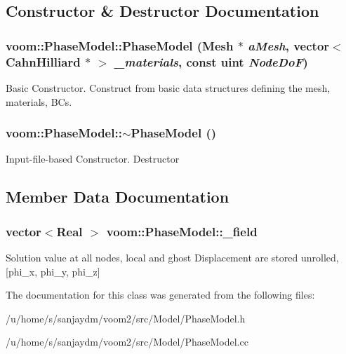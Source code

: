 \subsection{Constructor \& Destructor Documentation}
\hypertarget{classvoom_1_1_phase_model_a8cd3d41eb76b5e4f14b7f79fb546ba10}{
\subsubsection[{PhaseModel}]{\setlength{\rightskip}{0pt plus 5cm}voom::PhaseModel::PhaseModel ({\bf Mesh} $\ast$ {\em aMesh}, \/  vector$<$ {\bf CahnHilliard} $\ast$ $>$ {\em \_\-materials}, \/  const uint {\em NodeDoF})}}
\label{classvoom_1_1_phase_model_a8cd3d41eb76b5e4f14b7f79fb546ba10}


Basic Constructor. Construct from basic data structures defining the mesh, materials, BCs. \hypertarget{classvoom_1_1_phase_model_abf7ed3a23d7d1d2d36ecd84d847410e8}{
\subsubsection[{$\sim$PhaseModel}]{\setlength{\rightskip}{0pt plus 5cm}voom::PhaseModel::$\sim$PhaseModel ()}}
\label{classvoom_1_1_phase_model_abf7ed3a23d7d1d2d36ecd84d847410e8}


Input-\/file-\/based Constructor. Destructor 

\subsection{Member Data Documentation}
\hypertarget{classvoom_1_1_phase_model_ac2f861ab115758857f77583aae6aa051}{
\subsubsection[{\_\-field}]{\setlength{\rightskip}{0pt plus 5cm}vector$<$Real $>$ {\bf voom::PhaseModel::\_\-field}}}
\label{classvoom_1_1_phase_model_ac2f861ab115758857f77583aae6aa051}
Solution value at all nodes, local and ghost Displacement are stored unrolled, \mbox{[}phi\_\-x, phi\_\-y, phi\_\-z\mbox{]} 

The documentation for this class was generated from the following files:\begin{DoxyCompactItemize}
\item 
/u/home/s/sanjaydm/voom2/src/Model/PhaseModel.h\item 
/u/home/s/sanjaydm/voom2/src/Model/PhaseModel.cc\end{DoxyCompactItemize}

